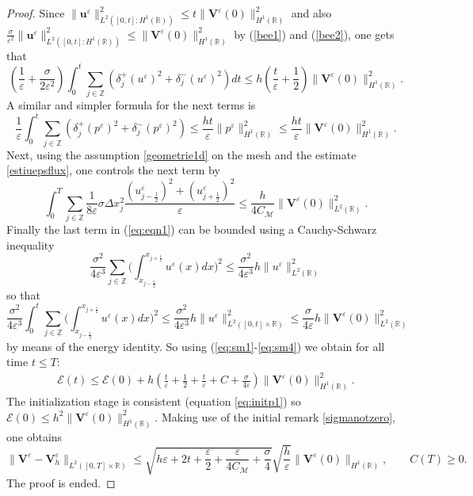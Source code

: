 \documentclass[a4paper,french,english,10pt]{article}
\newcommand\eps{\varepsilon}
\newcommand\V{\mathbf{V}}
\begin{document}
\begin{proof}
Since $\| \mathbf u^\eps  \|^2_{ L^2( [0,t] : H^1(\mathbb R) )}\leq t \| \V^{\eps}(0) \|_{H^1(\mathbb{R})}^2$ and also 
$\frac{\sigma}
{\eps^2}\| \mathbf u^\eps  \|^2_{ L^2( [0,t] : H^1(\mathbb R) )}\leq  \| \V^{\eps}(0) \|_{H^1(\mathbb{R})}^2$
by (\ref{bee1}) and (\ref{bee2}), one gets that
\begin{equation} \label{eq:sm1}
\left( \frac{1}{\eps}+\frac{\sigma}{2\eps^2}\right)
\int_0^t 
\sum_{j\in \mathbb{Z}} 
\left ( 
\delta_{j}^+(u^{\eps})^2+\delta_{j}^-(u^{\eps})^2\right )dt
\leq  h  \left( \frac{t}\eps+\frac{1}{2}\right)
\| \V^{\eps}(0) \|_{H^1(\mathbb{R})}^2.
\end{equation}
A similar and simpler formula for the next terms is
\begin{equation} \label{eq:sm2}
 \frac{1}{\eps}\int_0^t 
 \sum_{j\in \mathbb{Z}} 
 \left (
\delta_{j}^+(p^{\eps})^2+\delta_{j}^-(p^{\eps}
)^2\right ) \leq   \frac{ h t}\eps 
\|  p^\eps  \|^2_{  H^1(\mathbb R) }
\leq     \frac{ h t}\eps 
\| \V^{\eps}(0) \|_{H^1(\mathbb{R})}^2.
\end{equation}
Next, using the assumption \eqref{geometrie1d} on the mesh and the estimate \eqref{estiuepsflux}, one controls the next term by 
\begin{equation} \label{eq:sm3}
 \int_0^T \underset{j\in \mathbb{Z}}{\sum} \frac{1}{8\eps} \sigma \Delta x_j^2
\frac{(u_{j-\frac12 }^{\eps})^2+(
u_{j+\frac12 }^{\eps})^2}{\eps} \leq  \frac{h}{4C_{\mathcal{M}}} \|\mathbf{V}^{\eps}(0)\|_{L^2(\mathbb{R})}^2.
\end{equation}
Finally the last term in (\ref{eq:eqn1}) can be bounded using a
Cauchy-Schwarz inequality 
$$
\frac{\sigma^2}{4\eps^3} \sum_{j\in
\mathbb{Z}}\bigg( {\int_{x_{j-\frac12}}^{x_{j+\frac12}}} u^{\eps}(x) dx \bigg)^2
\leq 
\frac{\sigma^2}{4\eps^3}
h \|  u^\eps  \|^2_{  L^2(\mathbb R) }
$$
so that
\begin{equation} \label{eq:sm4}
\frac{\sigma^2}{4\eps^3} 
\int_0^t 
 \sum_{j\in
\mathbb{Z}}\bigg( {\int_{x_{j-\frac12}}^{x_{j+\frac12}}} u^{\eps}(x) dx \bigg)^2
\leq 
\frac{\sigma^2}{4\eps^3}
h \| u^\eps  \|^2_{  L^2([0,t]\times \mathbb R) }
\leq 
\frac{\sigma}{4\eps}
h  \|\mathbf{V}^{\eps}(0)\|_{L^2(\mathbb{R})}^2
\end{equation}
by means of the energy identity.
 So using (\ref{eq:sm1}-\ref{eq:sm4}) we obtain for all time $t\leq T$:
\begin{eqnarray*}
\mathscr{E}(t) \leq
\mathscr{E}(0)+h
\left( \frac{t}{\eps}+\frac{1}2 + \frac{t}{\eps}+C+\frac{\sigma
}{4\eps}\right)\| \V^{\eps}(0) \|_{H^1(\mathbb{R})}^2.
\end{eqnarray*}
The initialization stage is consistent (equation \ref{eq:initp1}) so 
 $\mathscr{E}(0)\leq h^2\| \V^{\eps}(0) \|_{H^1(\mathbb{R})}^2$.
 Making use of the  initial remark \ref{sigmanotzero}, one   obtains 
\begin{equation*}\label{esti1}
\|\V^{\eps}-\V^{\eps}_h \|_{L^2([0,T]\times \mathbb{R})}
\leq \sqrt{h\eps + 2t + \frac{\eps}{2} + \frac{\eps}{4C_{\mathcal{M}}} + \frac{\sigma}{4} } \sqrt{ \frac{h}{\eps}}
\| \V^{\eps}( 0)
\|_{H^1(\mathbb{R})}, \qquad C(T)\geq0.
\end{equation*}
The proof is ended.
\end{proof}
\end{document}

